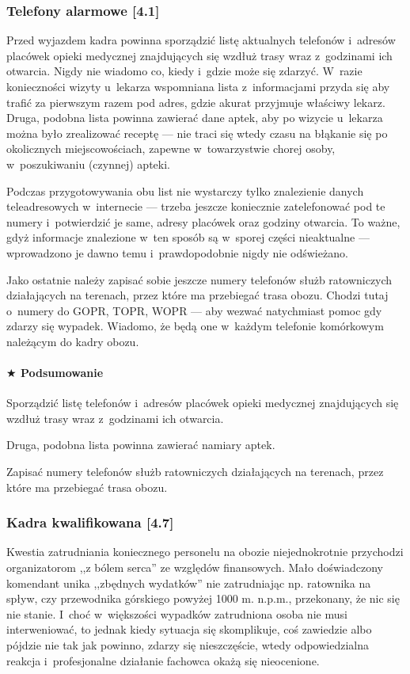 \documentclass[a5paper,10pt,titlepage,twoside]{article}
\newcommand*{\thecheckbox}{\hss$\Box$} %
\newenvironment*{checklist}
{\list{}{%
\renewcommand*{\makelabel}[1]{\thecheckbox}}}
{\endlist}
\begin{document}
\subsubsection{Telefony alarmowe [4.1]}
Przed wyjazdem kadra powinna sporządzić listę aktualnych telefonów i~adresów placówek opieki medycznej znajdujących się wzdłuż trasy wraz z~godzinami ich otwarcia. Nigdy nie wiadomo co, kiedy i~gdzie może się zdarzyć. W~razie konieczności wizyty u~lekarza wspomniana lista z~informacjami przyda się aby trafić za pierwszym razem pod adres, gdzie akurat przyjmuje właściwy lekarz. Druga, podobna lista powinna zawierać dane aptek, aby po wizycie u~lekarza można było zrealizować receptę --- nie traci się wtedy czasu na błąkanie się po okolicznych miejscowościach, zapewne w~towarzystwie chorej osoby, w~poszukiwaniu (czynnej) apteki.

Podczas przygotowywania obu list nie wystarczy tylko znalezienie danych teleadresowych w~internecie --- trzeba jeszcze koniecznie zatelefonować pod te numery i~potwierdzić je same, adresy placówek oraz godziny otwarcia. To ważne, gdyż informacje znalezione w~ten sposób są w~sporej części nieaktualne --- wprowadzono je dawno temu i~prawdopodobnie nigdy nie odświeżano.

Jako ostatnie należy zapisać sobie jeszcze numery telefonów służb ratowniczych działających na terenach, przez które ma przebiegać trasa obozu. Chodzi tutaj o~numery do GOPR, TOPR, WOPR --- aby wezwać natychmiast pomoc gdy zdarzy się wypadek. Wiadomo, że będą one w~każdym telefonie komórkowym należącym do kadry obozu.

\paragraph{$\bigstar$ Podsumowanie}
\begin{checklist}
\item Sporządzić listę telefonów i~adresów placówek opieki medycznej znajdujących się wzdłuż trasy wraz z~godzinami ich otwarcia.
\item Druga, podobna lista powinna zawierać namiary aptek.
\item Zapisać numery telefonów służb ratowniczych działających na terenach, przez które ma przebiegać trasa obozu.
\end{checklist}

\subsubsection{Kadra kwalifikowana [4.7]}
Kwestia zatrudniania koniecznego personelu na obozie niejednokrotnie przychodzi organizatorom ,,z bólem serca'' ze względów finansowych. Mało doświadczony komendant unika ,,zbędnych wydatków'' nie zatrudniając np. ratownika na spływ, czy przewodnika górskiego powyżej 1000 m. n.p.m., przekonany, że nic się nie stanie. I~choć w~większości wypadków zatrudniona osoba nie musi interweniować, to jednak kiedy sytuacja się skomplikuje, coś zawiedzie albo pójdzie nie tak jak powinno, zdarzy się nieszczęście, wtedy odpowiedzialna reakcja i~profesjonalne działanie fachowca okażą się nieocenione.
\end{document}
